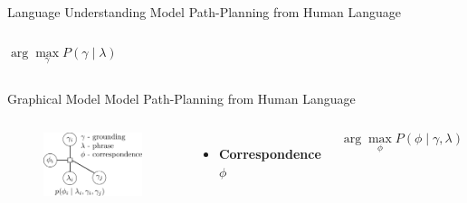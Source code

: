 \begin{frame}{Language Understanding}{ Model Path-Planning from Human Language }
\begin{columns}
	\begin{block}{}
	\begin{equation}
	\nonumber
	\arg \max_{\gamma} P( \gamma \mid \lambda )
 	\end{equation}
 	\end{block}
 	
\end{columns}


\end{frame}

\begin{frame}{Graphical Model}{ Model Path-Planning from Human Language }

\begin{columns}
\begin{figure}
	\centering
	\includegraphics[width=.8\linewidth]{figure/factor_model}
\end{figure}
\begin{itemize}
\item {\bf Correspondence $ \phi $}
\end{itemize}

\begin{block}{}
\begin{equation}
\nonumber
\arg \max_{\phi} P( \phi \mid \gamma , \lambda )
\end{equation}
\end{block}

\end{columns}

\end{frame}

